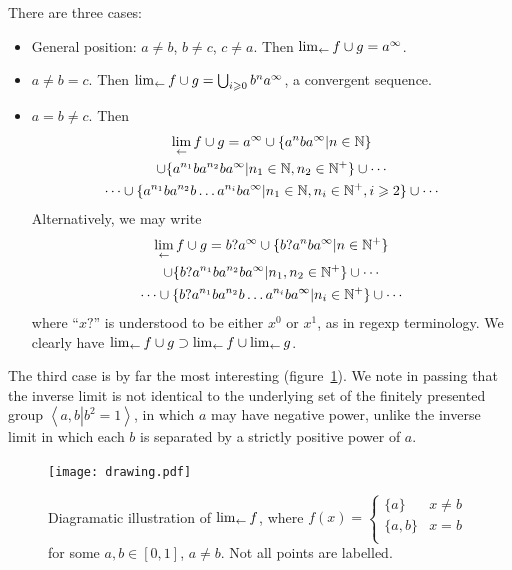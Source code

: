 \documentclass{article}
\theoremstyle{definition}
\begin{document}
There are three cases:

\begin{itemize}
\item General position: $a\neq b$, $b\neq c$, $c\neq a$.  Then
  $\lim_{\leftarrow} f\cup g=a^\infty$.
\item $a\neq b=c$.  Then $\lim_{\leftarrow} f\cup g=\bigcup_{i\geqslant
  0}b^na^\infty$, a convergent sequence.
\item $a=b\neq c$.  Then
  \begin{multline}
    \lim_{\leftarrow} f\cup g=
    a^\infty\cup
    \lbrace a^nba^\infty|n\in\mathbb{N}\rbrace\\
    \cup\lbrace a^{n_1}ba^{n_2}ba^\infty|n_1\in\mathbb{N},n_2\in\mathbb{N^+}\rbrace
    \cup\cdots\\
    \cdots\cup\lbrace a^{n_1}ba^{n_2}b\ldots a^{n_i}ba^\infty|n_1\in\mathbb{N},n_i\in\mathbb{N}^+,i\geqslant 2\rbrace
    \cup\cdots
  \end{multline}
  Alternatively, we may write
  \begin{multline}
    \lim_{\leftarrow} f\cup g=
    b?a^\infty\cup
    \lbrace b?a^nba^\infty|n\in\mathbb{N^+}\rbrace\\
    \cup\lbrace b?a^{n_1}ba^{n_2}ba^\infty|n_1,n_2\in\mathbb{N^+}\rbrace
    \cup\cdots\\
    \cdots\cup\lbrace b?a^{n_1}ba^{n_2}b\ldots a^{n_i}ba^\infty|n_i\in\mathbb{N}^+\rbrace\cup\cdots
  \end{multline}
  where ``$x?$'' is understood to be either $x^0$ or $x^1$, as in
  regexp terminology.  We clearly have $\lim_{\leftarrow} f\cup
    g\supset\lim_{\leftarrow} f\cup\lim_{\leftarrow} g$.
\end{itemize}

The third case is by far the most interesting (figure~\ref{drawing}).
We note in passing that the inverse limit is not identical to the
underlying set of the finitely presented group $\left\langle
a,b\left|b^2=1\right.\right\rangle$, in which $a$ may have negative
power, unlike the inverse limit in which each $b$ is separated by a
strictly positive power of $a$.

\begin{figure}[h]
\centering
\texttt{[image: drawing.pdf]}
\caption[width=\textwidth]{Diagramatic illustration of 
  \label{drawing} $\lim_{\leftarrow} f$, where $f(x) = \begin{cases}
    \lbrace a\rbrace & x\neq b\\
    \lbrace a,b\rbrace & x=b\\
  \end{cases}$ for some $a,b\in[0,1]$, $a\neq b$.  Not all points are
  labelled.}
\end{figure}
\end{document}
